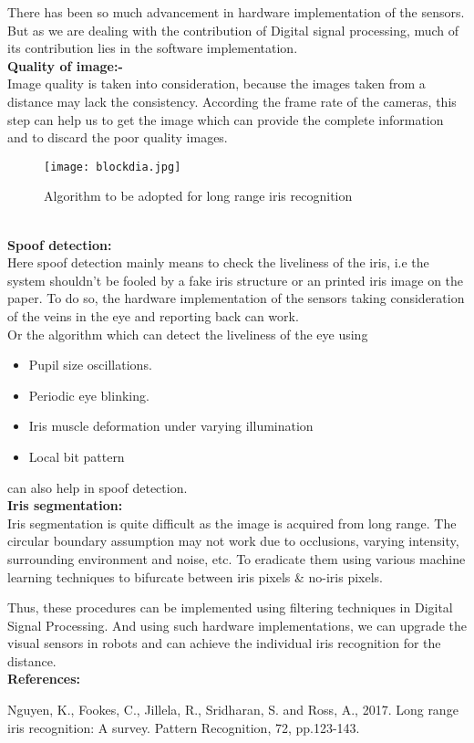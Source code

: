 \documentclass{report}
\begin{document}
\noindent There has been so much advancement in hardware implementation of the sensors. But as we are dealing with the contribution of Digital signal processing, much of its contribution lies in the software implementation.\\

\noindent \textbf{Quality of image:-}\\
\noindent Image quality is taken into consideration, because the images taken from a distance may lack the consistency. According the frame rate of the cameras, this step can help us to get the image which can provide the complete information and to discard the poor quality images.\\

\begin{figure}
\centering
    \texttt{[image: blockdia.jpg]}
    \caption{Algorithm to be adopted for long range iris recognition}
\end{figure}\\

\noindent \textbf{Spoof detection:}\\

\noindent Here spoof detection mainly means to check the liveliness of the iris, i.e the system shouldn’t be fooled by a fake iris structure or an printed iris image on the paper. To do so, the hardware implementation of the sensors taking consideration of the veins in the eye and reporting back can work.\\
\npindent Or the algorithm which can detect the liveliness of the eye using
\begin{itemize}
    \item 	Pupil size oscillations.
    \item Periodic eye blinking.
    \item Iris muscle deformation under varying illumination
    \item Local bit pattern
\end{itemize}
\noindent can also help in spoof detection.\\

\noindent \textbf{Iris segmentation:}\\
\noindent Iris segmentation is quite difficult as the image is acquired from long range. The circular boundary assumption may not work due to occlusions, varying intensity, surrounding environment and noise, etc. To eradicate them using various machine learning techniques to bifurcate between iris pixels \& no-iris pixels.

\noindent Thus, these procedures can be implemented using filtering techniques in Digital Signal Processing. And using such hardware implementations, we can upgrade the visual sensors in robots and can achieve the individual iris recognition for the distance.\\

\noindent \textbf{References:}\\
\item	Nguyen, K., Fookes, C., Jillela, R., Sridharan, S. and Ross, A., 2017. Long range iris recognition: A survey. Pattern Recognition, 72, pp.123-143.
\end{document}
